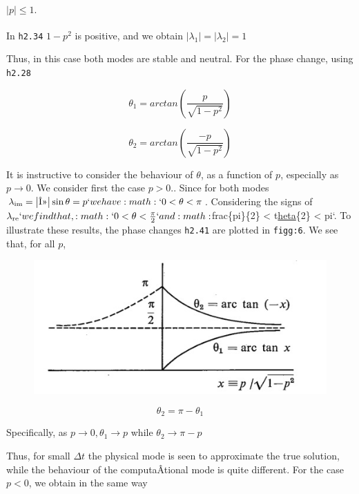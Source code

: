 \paragraph{\texorpdfstring{\(\left| p \right| \leq 1.\)}{\textbackslash left\textbar{} p \textbackslash right\textbar{} \textbackslash leq 1.}}\label{left-p-right-leq-1.}

In \texttt{h2.34} \(1 - p^{2}\) is positive, and we obtain
\(\left| \lambda_{1} \right| = \left| \lambda_{2} \right| = 1\)

Thus, in this case both modes are stable and neutral. For the phase
change, using \texttt{h2.28}

\[\theta_{1} = arctan\left( \frac{p}{\sqrt{1 - p^{2}}} \right)\]

\[\theta_{2} = arctan\left( \frac{- p}{\sqrt{1 - p^{2}}} \right)\]

It is instructive to consider the behaviour of \(\theta\), as a function
of \(p\), especially as \(p \rightarrow 0.\) We consider first the case
\(p > 0.\). Since for both modes
\(\lambda_{\text{im}} = \left| \text{Î»} \right|\sin{\theta = p}`we
have :math:`0 < \theta < \pi\). Considering the signs of
\(\lambda_{\text{re}}`we find that,
:math:`0 < \theta < \frac{\pi}{2}`and
:math:\)frac\{pi\}\{2\} \textless{} t\href{}{heta}\{2\} \textless{} pi`.
To illustrate these results, the phase changes \texttt{h2.41} are
plotted in \texttt{figg:6}. We see that, for all \(p\),

\begin{figure}
    \centering
    \includegraphics[width = .7 \textwidth]{figs/NM/pic6.jpg}
    \caption{} \label{fig:}
\end{figure}

\[\theta_{2} = \pi - \theta_{1}\]

Specifically, as \(p \rightarrow 0, \theta_{1} \rightarrow p\) while
\(\theta_{2} \rightarrow \pi - p\)

Thus, for small \(\Delta t\) the physical mode is seen to approximate
the true solution, while the behaviour of the computaÂ­tional mode is
quite different. For the case \(p < 0\), we obtain in the same way

